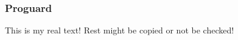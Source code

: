 \subsubsection{Proguard} \label{subsubsection:counter-reengineering-optobf-proguard}
This is my real text! Rest might be copied or not be checked!
